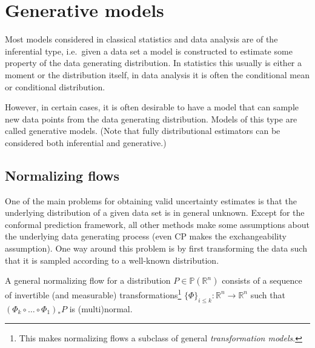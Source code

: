 \section{Generative models}

    Most models considered in classical statistics and data analysis are of the inferential type, i.e.~given a data set a model is constructed to estimate some property of the data generating distribution. In statistics this usually is either a moment or the distribution itself, in data analysis it is often the conditional mean or conditional distribution.

    However, in certain cases, it is often desirable to have a model that can sample new data points from the data generating distribution. Models of this type are called generative models. (Note that fully distributional estimators can be considered both inferential and generative.)


\subsection{Normalizing flows}

    One of the main problems for obtaining valid uncertainty estimates is that the underlying distribution of a given data set is in general unknown. Except for the conformal prediction framework, all other methods make some assumptions about the underlying data generating process (even CP makes the exchangeability assumption). One way around this problem is by first transforming the data such that it is sampled according to a well-known distribution.

    A general normalizing flow for a distribution $P\in\mathbb{P}(\mathbb{R}^n)$ consists of a sequence of invertible (and measurable) transformations\footnote{This makes normalizing flows a subclass of general \textit{transformation models}.} $\{\Phi\}_{i\leq k}:\mathbb{R}^n\rightarrow\mathbb{R}^n$ such that $(\Phi_k\circ\ldots\circ\Phi_1)_*P$ is (multi)normal.

